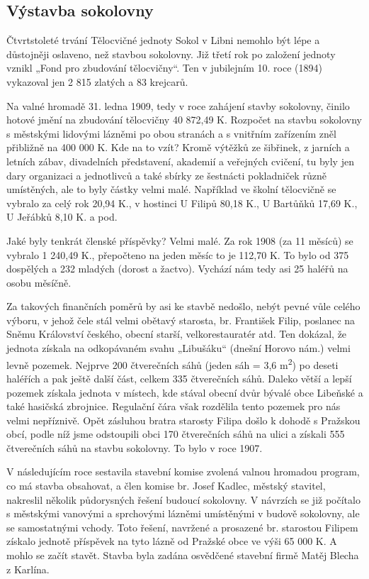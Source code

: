 \subsection{Výstavba sokolovny}\label{vuxfdstavba-sokolovny}

Čtvrtstoleté trvání Tělocvičné jednoty Sokol v Libni nemohlo být lépe a
důstojněji oslaveno, než stavbou sokolovny. Již třetí rok po založení
jednoty vznikl „Fond pro zbudování tělocvičny``. Ten v jubilejním 10.
roce (1894) vykazoval jen 2 815 zlatých a 83 krejcarů.

Na valné hromadě 31. ledna 1909, tedy v roce zahájení stavby sokolovny,
činilo hotové jmění na zbudování tělocvičny 40 872,49 K. Rozpočet na
stavbu sokolovny s městskými lidovými lázněmi po obou stranách a s
vnitřním zařízením zněl přibližně na 400 000 K. Kde na to vzít? Kromě
výtěžků ze šibřinek, z jarních a letních zábav, divadelních představení,
akademií a veřejných cvičení, tu byly jen dary organizaci a jednotlivců
a také sbírky ze šestnácti pokladniček různě umístěných, ale to byly
částky velmi malé. Například ve školní tělocvičně se vybralo za celý rok
20,94 K., v hostinci U Filipů 80,18 K., U Bartůňků 17,69 K., U Jeřábků
8,10 K. a pod.

Jaké byly tenkrát členské příspěvky? Velmi malé. Za rok 1908 (za 11
měsíců) se vybralo 1 240,49 K., přepočteno na jeden měsíc to je 112,70
K. To bylo od 375 dospělých a 232 mladých (dorost a žactvo). Vychází nám
tedy asi 25 haléřů na osobu měsíčně.

Za takových finančních poměrů by asi ke stavbě nedošlo, nebýt pevné vůle
celého výboru, v jehož čele stál velmi obětavý starosta, br. František
Filip, poslanec na Sněmu Království českého, obecní starší,
velkorestauratér atd. Ten dokázal, že jednota získala na odkopávaném
svahu „Libušáku`` (dnešní Horovo nám.) velmi levně pozemek. Nejprve 200
čtverečních sáhů (jeden sáh = 3,6 m\textsuperscript{2}) po deseti
haléřích a pak ještě další část, celkem 335 čtverečních sáhů. Daleko
větší a lepší pozemek získala jednota v místech, kde stával obecní dvůr
bývalé obce Libeňské a také hasičská zbrojnice. Regulační čára však
rozdělila tento pozemek pro nás velmi nepříznivě. Opět zásluhou bratra
starosty Filipa došlo k dohodě s Pražskou obcí, podle níž jsme
odstoupili obci 170 čtverečních sáhů na ulici a získali 555 čtverečních
sáhů na stavbu sokolovny. To bylo v roce 1907.

V následujícím roce sestavila stavební komise zvolená valnou hromadou
program, co má stavba obsahovat, a člen komise br. Josef Kadlec, městský
stavitel, nakreslil několik půdorysných řešení budoucí sokolovny. V
návrzích se již počítalo s městskými vanovými a sprchovými lázněmi
umístěnými v budově sokolovny, ale se samostatnými vchody. Toto řešení,
navržené a prosazené br. starostou Filipem získalo jednotě příspěvek na
tyto lázně od Pražské obce ve výši 65 000 K. A mohlo se začít stavět.
Stavba byla zadána osvědčené stavební firmě Matěj Blecha z Karlína.

